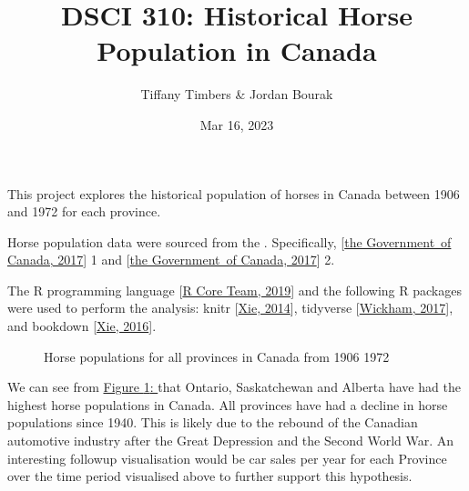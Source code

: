 \documentclass[letterpaper,10pt,english]{jupyterBook}
\title{DSCI 310: Historical Horse Population in Canada}
\date{Mar 16, 2023}
\author{Tiffany Timbers \& Jordan Bourak}
\begin{document}
\pagestyle{empty}
\sphinxmaketitle
\pagestyle{plain}
\sphinxtableofcontents
\pagestyle{normal}
\label{\detokenize{jbook_example::doc}}


\sphinxAtStartPar
This project explores the historical population of horses in Canada
between 1906 and 1972 for each province.

\begin{DUlineblock}{0em}
\item[] 
\end{DUlineblock}

\sphinxAtStartPar
Horse population data were sourced from the .
Specifically, {[}\hyperlink{cite.jbook_example:id14}{the Government of Canada, 2017}{]} 1 and {[}\hyperlink{cite.jbook_example:id15}{the Government of Canada, 2017}{]} 2.

\begin{DUlineblock}{0em}
\item[] 
\end{DUlineblock}

\sphinxAtStartPar
The R programming language {[}\hyperlink{cite.jbook_example:id9}{R Core Team, 2019}{]} and the following R packages were used
to perform the analysis: knitr {[}\hyperlink{cite.jbook_example:id13}{Xie, 2014}{]}, tidyverse {[}\hyperlink{cite.jbook_example:id12}{Wickham, 2017}{]}, and
bookdown {[}\hyperlink{cite.jbook_example:id11}{Xie, 2016}{]}.

\begin{DUlineblock}{0em}
\item[] 
\end{DUlineblock}

\begin{figure}[htbp]
\centering
\capstart

\noindent{}
\caption{Horse populations for all provinces in Canada from 1906 \sphinxhyphen{} 1972}\label{\detokenize{jbook_example:horse-pops}}\end{figure}

\sphinxAtStartPar
We can see from \hyperref[\detokenize{jbook_example:horse-pops}]{Figure \ref{\detokenize{jbook_example:horse-pops}}: }
that Ontario, Saskatchewan and Alberta have had the highest horse populations in Canada.
All provinces have had a decline in horse populations since 1940.
This is likely due to the rebound of the Canadian automotive
industry after the Great Depression and the Second World War.
An interesting follow\sphinxhyphen{}up visualisation would be car sales per year for each
Province over the time period visualised above to further support this hypothesis.
\end{document}
